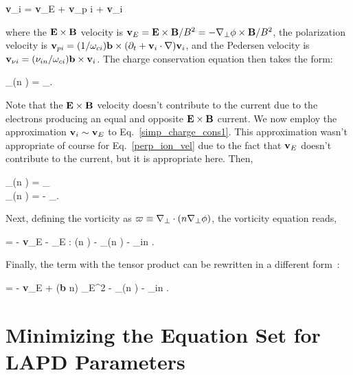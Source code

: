 \beq
\label{perp_ion_vel}
{\bf v}_{\perp i} = {\bf v}_{E} + {\bf v}_{p i} + {\bf v}_{\nu i}
\eeq

where the ${\bf E \times B}$ velocity is ${\bf v}_E = {\bf E} \times {\bf B}/B^2 = - \nabla_\perp \phi \times {\bf B}/B^2$,
the polarization velocity is ${\bf v}_{p i} = (1/\omega_{c i}) {\bf b} \times (\partial_t + {\bf v}_i \cdot \nabla) {\bf v}_i$, and the Pedersen velocity is 
${\bf v}_{\nu i} = (\nu_{in}/\omega_{c i}) {\bf b} \times {\bf v}_i$. The charge conservation equation then takes the form:

\beq
\label{simp_charge_cons1}
\nabla_\para (n \vpe) =  \nabla_\perp \cdot {}.
\eeq

Note that the ${\bf E \times B}$ velocity doesn't contribute to the current due to the electrons producing an equal and opposite ${\bf E \times B}$ current.
We now employ the approximation ${\bf v}_i \sim {\bf v}_E$ to Eq.~\ref{simp_charge_cons1}. This approximation wasn't appropriate
of course for Eq.~\ref{perp_ion_vel} due to the fact that ${\bf v}_E$ doesn't contribute to the current, but it is appropriate here. Then,

\beqar
\label{simp_charge_cons2}
\nabla_\para (n \vpe) =  \nabla_\perp \cdot {} \rightarrow \\ \nonumber
\nabla_\para (n \vpe) = -  \nabla_\perp \cdot {}.
\eeqar

Next, defining the vorticity as $\varpi \equiv \nabla_\perp \cdot (n \nabla_\perp \phi)$, the vorticity equation reads,

\beq
\label{vort_eqn1}
 = - {\bf v}_E \cdot \gradperp \varpi - _E : \gradperp (n \gradperp \phi) -  \grad_\para (n \vpe) - \nu_{in} \varpi.
\eeq

Finally, the term with the tensor product can be rewritten in a different form~\cite{Popovich2010a}:

\beq
\label{vort_eqn2}
 = - {\bf v}_E \cdot \gradperp \varpi +  ({\bf b} \times \gradperp n) \cdot {}_E^2   -  \grad_\para (n \vpe) - \nu_{in} \varpi.
\eeq


\section{Minimizing the Equation Set for LAPD Parameters}
\label{s_reduced_eqns}

